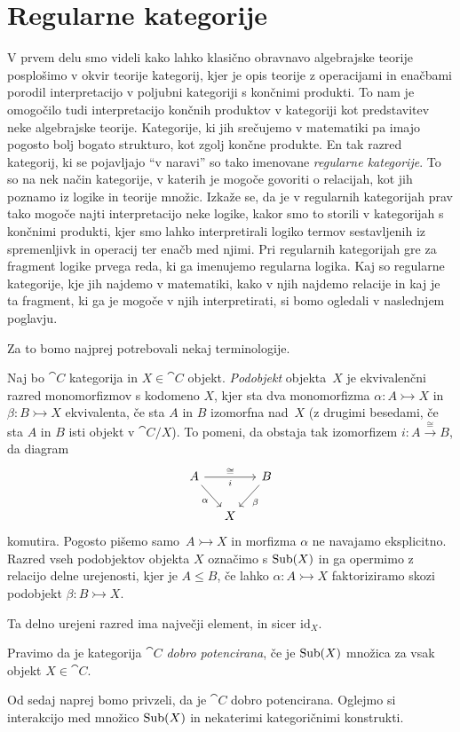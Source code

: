 \documentclass[../kategoricna_logika.tex]{subfiles}
\begin{document}
\section{Regularne kategorije}
V prvem delu smo videli kako lahko klasično obravnavo algebrajske
teorije posplošimo v okvir teorije kategorij, kjer je opis teorije z
operacijami in enačbami porodil interpretacijo v poljubni kategoriji s končnimi
produkti. To nam je omogočilo tudi interpretacijo končnih produktov v
kategoriji kot predstavitev neke algebrajske teorije. Kategorije, ki
jih srečujemo v matematiki pa imajo pogosto bolj bogato strukturo,
kot zgolj končne produkte. En tak razred kategorij,
ki se pojavljajo ``v naravi'' so tako imenovane \emph{regularne
  kategorije}.  To so na nek način kategorije, v katerih je mogoče
govoriti o relacijah, kot jih poznamo iz logike in teorije množic.
Izkaže se, da je v regularnih kategorijah prav tako mogoče najti
interpretacijo neke logike, kakor smo to storili v kategorijah
s končnimi produkti, kjer smo lahko interpretirali logiko termov
sestavljenih iz spremenljivk in operacij ter enačb med njimi.
Pri regularnih kategorijah gre za fragment logike prvega reda, ki ga imenujemo
regularna logika.  Kaj so regularne kategorije, kje jih najdemo v
matematiki, kako v njih najdemo relacije in kaj je ta fragment,
ki ga je mogoče v njih interpretirati, si bomo ogledali v naslednjem
poglavju.

Za to bomo najprej potrebovali nekaj terminologije.
\begin{definicija}
  Naj bo $\cat{C}$ kategorija in $X \in \cat{C}$ objekt.
  \emph{Podobjekt} objekta~$X$ je ekvivalenčni razred monomorfizmov s kodomeno
  $X$, kjer sta dva monomorfizma $\alpha: A \rightarrowtail X$ in
  $\beta : B \rightarrowtail X$ ekvivalenta, če sta $A$ in $B$
  izomorfna nad~$X$ (z drugimi besedami, če sta $A$ in $B$ isti objekt
  v $\cat{C}/X$).  To pomeni, da obstaja tak izomorfizem
  $i : A \xrightarrow{\cong} B$, da diagram
  \begin{equation*}
    \begin{tikzcd}[column sep=small]
      A \ar[rr, "i"']{a}{\cong} \ar[dr, "\alpha"'] & & B \ar[dl, "\beta"] \\
      & X &
    \end{tikzcd}
  \end{equation*}
  komutira. Pogosto pišemo samo~${A \rightarrowtail X}$ in morfizma
  $\alpha$ ne navajamo eksplicitno.  Razred vseh podobjektov objekta
  $X$ označimo s $\operatorname{Sub}(X)$ in ga opermimo z relacijo delne urejenosti,
  kjer je $A \leq B$, če lahko $\alpha : A \rightarrowtail X$
  faktoriziramo skozi podobjekt $\beta : B \rightarrowtail X$.
\end{definicija}
Ta delno urejeni razred ima največji element, in sicer
$\mathrm{id}_X$.
\begin{definicija}
  Pravimo da je kategorija $\cat{C}$ \emph{dobro potencirana}, če je
  $\operatorname{Sub}(X)$ množica za vsak objekt $X \in \cat{C}$.
\end{definicija}
Od sedaj naprej bomo privzeli, da je $\cat{C}$ dobro potencirana.
Oglejmo si interakcijo med množico $\operatorname{Sub}(X)$ in nekaterimi
kategoričnimi konstrukti.
\end{document}
